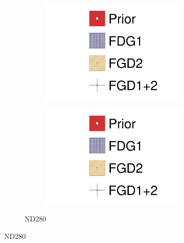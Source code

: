 \begin{figure}[h]
\begin{subfigure}[t]{\textwidth}
\begin{subfigure}[t]{0.24\textwidth}
		\end{subfigure}
		\begin{subfigure}[t]{0.24\textwidth}
			\includegraphics[width=\textwidth,page=8, trim={0mm 0mm 0mm 9mm}, clip]{figures/mach3/2018/data/2018a_FixedCov_RedCov_Mpi_FGD1Only_Data_merge_2018a_FixedCov_RedCov_Mpi_FGD2Only_Data_merge_2018a_FixedCov_RedCov_Mpi_Data_merge}
		\end{subfigure}
		\begin{subfigure}[t]{0.24\textwidth}
			\includegraphics[width=\textwidth,page=9, trim={0mm 0mm 0mm 9mm}, clip]{figures/mach3/2018/data/2018a_FixedCov_RedCov_Mpi_FGD1Only_Data_merge_2018a_FixedCov_RedCov_Mpi_FGD2Only_Data_merge_2018a_FixedCov_RedCov_Mpi_Data_merge}
		\end{subfigure}
		\caption{ND280}
	\end{subfigure}
	

\end{figure}
